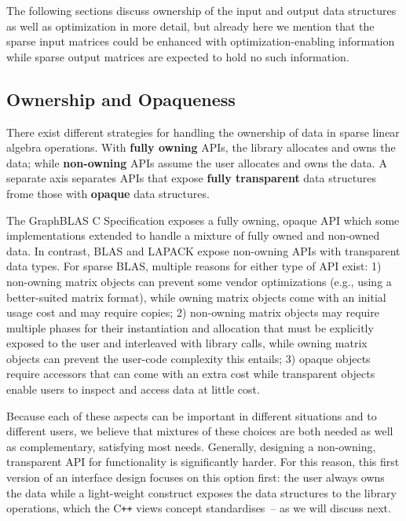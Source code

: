\documentclass[manuscript,review]{acmart}
\newcommand{\cplusplus}{C\texttt{++}\xspace}
\begin{document}
The following sections discuss ownership of the input and output data structures as well as optimization in more detail,
but already here we mention that the sparse input matrices could be enhanced with optimization-enabling information while sparse output matrices are expected to hold no such information.






\subsection{Ownership and Opaqueness}
\label{sec:ownership}

There exist different strategies for handling the ownership of data in sparse linear algebra operations. 
With \textbf{fully owning} APIs, the library allocates and owns the data; while
\textbf{non-owning} APIs assume the user allocates and owns the data.
A separate axis separates APIs that expose \textbf{fully transparent} data structures frome those with \textbf{opaque} data structures.

The GraphBLAS C Specification exposes a fully owning, opaque API which some implementations extended to handle a mixture of fully owned and non-owned data.
In contrast,
BLAS and LAPACK expose non-owning APIs with transparent data types.
For sparse BLAS,
multiple reasons for either type of API exist:
1) non-owning matrix objects can prevent some vendor optimizations (e.g., using a better-suited matrix format), while owning matrix objects come with an initial usage cost and may require copies;
2) non-owning matrix objects may require multiple phases for their instantiation and allocation that must be explicitly exposed to the user and interleaved with library calls, while owning matrix objects can prevent the user-code complexity this entails;
3) opaque objects require accessors that can come with an extra cost while transparent objects enable users to inspect and access data at little cost.

Because each of these aspects can be important in different situations and to different users, we believe that mixtures of these choices are both needed as well as complementary, satisfying most needs. Generally, designing a non-owning, transparent API for functionality is significantly harder. For this reason, this first version of an interface design focuses on this option first:
the user always owns the data while a light-weight construct exposes the data structures to the library operations, which the \cplusplus views concept standardises~\cite{cpplinalg:p1673r13}-- as we will discuss next.
\end{document}
